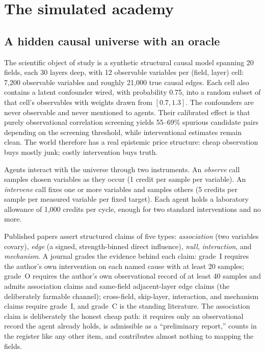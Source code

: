 \documentclass[11pt]{article}
\begin{document}
\section{The simulated academy}
\label{sec:world}

\subsection{A hidden causal universe with an oracle}

The scientific object of study is a synthetic structural causal model spanning 20 fields, each 30 layers deep, with 12 observable variables per (field, layer) cell: 7{,}200 observable variables and roughly 21{,}000 true causal edges. Each cell also contains a latent confounder wired, with probability 0.75, into a random subset of that cell's observables with weights drawn from $[0.7, 1.3]$. The confounders are never observable and never mentioned to agents. Their calibrated effect is that purely observational correlation screening yields 55--69\% spurious candidate pairs depending on the screening threshold, while interventional estimates remain clean. The world therefore has a real epistemic price structure: cheap observation buys mostly junk; costly intervention buys truth.

Agents interact with the universe through two instruments. An \emph{observe} call samples chosen variables as they occur (1 credit per sample per variable). An \emph{intervene} call fixes one or more variables and samples others (5 credits per sample per measured variable per fixed target). Each agent holds a laboratory allowance of 1{,}000 credits per cycle, enough for two standard interventions and no more.

Published papers assert structured claims of five types: \emph{association} (two variables covary), \emph{edge} (a signed, strength-binned direct influence), \emph{null}, \emph{interaction}, and \emph{mechanism}. A journal grades the evidence behind each claim: grade~I requires the author's own intervention on each named cause with at least 20 samples; grade~O requires the author's own observational record of at least 40 samples and admits association claims and same-field adjacent-layer edge claims (the deliberately farmable channel); cross-field, skip-layer, interaction, and mechanism claims require grade~I, and grade~C is the standing literature. The association claim is deliberately the honest cheap path: it requires only an observational record the agent already holds, is admissible as a ``preliminary report,'' counts in the register like any other item, and contributes almost nothing to mapping the fields.
\end{document}
